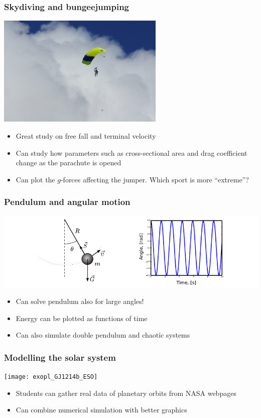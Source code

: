 \documentclass[english, 12pt]{beamer}
\begin{document}
\begin{frame}[fragile]
\frametitle{Skydiving and bungeejumping}

\begin{center}
\includegraphics[width=0.6\textwidth]{skydiving}
\end{center}

\begin{itemize}
	\item Great study on free fall and terminal velocity
	\item Can study how parameters such as cross-sectional area and drag coefficient change as the parachute is opened
	\item Can plot the $g$-forces affecting the jumper. Which sport is more ``extreme''?
\end{itemize}
\end{frame}

\begin{frame}[fragile]
\frametitle{Pendulum and angular motion}

\begin{center}
\includegraphics[width=\textwidth]{pendulum}
\end{center}

\begin{itemize}
	\item Can solve pendulum also for large angles!
	\item Energy can be plotted as functions of time
	\item Can also simulate double pendulum and chaotic systems
\end{itemize}
\end{frame}

\begin{frame}[fragile]
\frametitle{Modelling the solar system}

\begin{center}
\texttt{[image: exopl\_GJ1214b\_ESO]}
\end{center}

\begin{itemize}
	\item Students can gather real data of planetary orbits from NASA webpages
	\item Can combine numerical simulation with better graphics
\end{itemize}
\end{frame}
\end{document}
